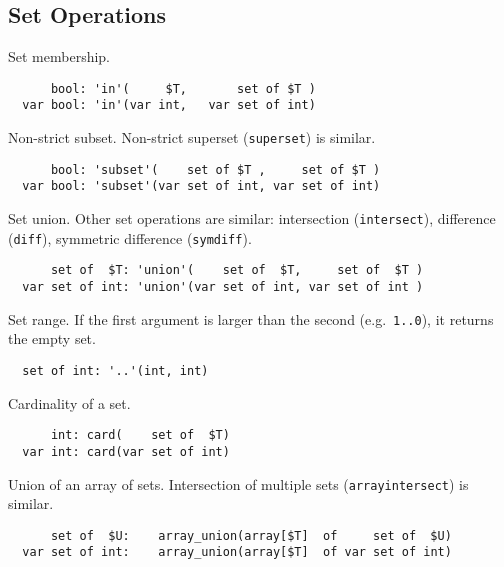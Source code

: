 \documentclass[10pt]{scrartcl}
\newcommand{\ignore}[1]{}
\begin{document}
\subsection{Set Operations}
\builtin{}
Set membership.
\begin{verbatim}
      bool: 'in'(     $T,       set of $T )
  var bool: 'in'(var int,   var set of int)
\end{verbatim}

\builtin{}
Non-strict subset.  Non-strict superset (\texttt{superset}) is similar.
\begin{verbatim}
      bool: 'subset'(    set of $T ,     set of $T )
  var bool: 'subset'(var set of int, var set of int)
\end{verbatim}

\builtin{}
Set union.  Other set operations are similar:
intersection (\texttt{intersect}),
difference (\texttt{diff}),
symmetric difference (\texttt{symdiff}).
\begin{verbatim}
      set of  $T: 'union'(    set of  $T,     set of  $T )
  var set of int: 'union'(var set of int, var set of int )
\end{verbatim}

\builtin{}
Set range.  If the first argument is larger than the second
(e.g.~\texttt{1..0}), it returns the empty set.
\begin{verbatim}
  set of int: '..'(int, int)
\end{verbatim}

\builtin{}
Cardinality of a set.
\begin{verbatim}
      int: card(    set of  $T)
  var int: card(var set of int)
\end{verbatim}

\builtin{}
Union of an array of sets.
Intersection of multiple sets (\texttt{array\n{}intersect}) is similar.
\begin{verbatim}
      set of  $U:    array_union(array[$T]  of     set of  $U)
  var set of int:    array_union(array[$T]  of var set of int)
\end{verbatim}

\ignore{
\builtin{}
Power set.
\begin{verbatim}
  set of set of $T: powerset(set of $T)
\end{verbatim}

\builtin{}
Cartesian product of sets.   This list is only partial, it extends in the
obvious way, for greater numbers of sets.
\begin{verbatim}
  set of tuple($T1, $T2):      cartesian_product(set of $T1, set of $T2)
  set of tuple($T1, $T2, $T3): cartesian_product(set of $T1, set of $T2,
                                                 set of $T3)
  ...
\end{verbatim}
}
\end{document}
